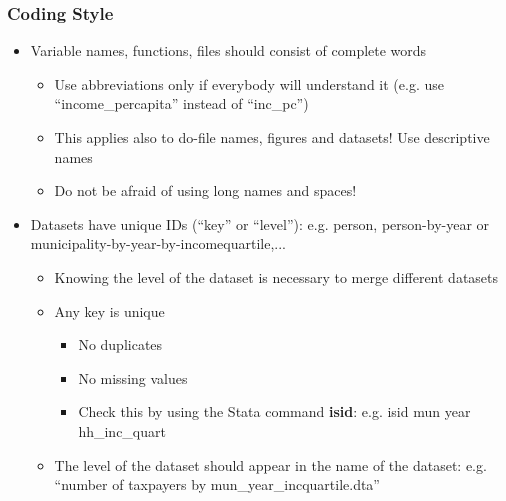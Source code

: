 \documentclass{beamer}
\begin{document}
\frame
{
	\frametitle{Coding Style}
	
	\begin{itemize}
		\item Variable names, functions, files should consist of complete words
		\begin{itemize}
			\item Use abbreviations only if everybody will understand it (e.g. use ``income\_percapita'' instead of ``inc\_pc'')
			\item This applies also to do-file names, figures and datasets! Use descriptive names
			\item Do not be afraid of using long names and spaces!  
		\end{itemize}
	\item Datasets have unique IDs (``key'' or ``level''): e.g. person, person-by-year or municipality-by-year-by-incomequartile,...
	\begin{itemize}
		\item Knowing the level of the dataset is necessary to merge different datasets
		\item Any key is unique
		\begin{itemize}
			\item No duplicates
			\item No missing values
			\item Check this by using the Stata command \textbf{isid}: e.g. isid mun year hh\_inc\_quart
		\end{itemize}
	\item The level of the dataset should appear in the name of the dataset: e.g. ``number of taxpayers by mun\_year\_incquartile.dta''
	\end{itemize}
	\end{itemize}	
	
}
\frame
\end{document}
